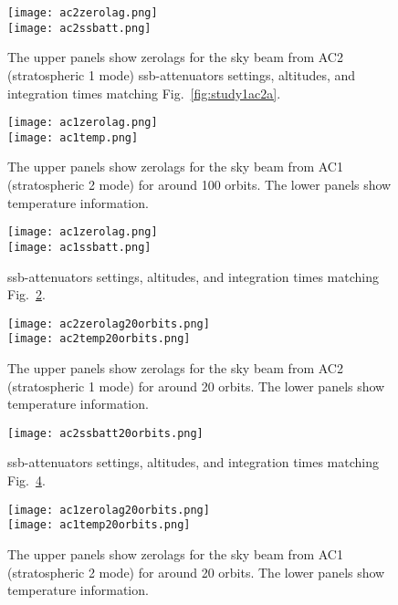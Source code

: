\begin{figure}[!t]
\centering
\texttt{[image: ac2zerolag.png]}\\
\texttt{[image: ac2ssbatt.png]}\\
\caption{The upper panels show zerolags for the sky beam from AC2 
(stratospheric 1 mode)
ssb-attenuators settings, altitudes, and integration times
matching Fig.~\ref{fig:study1ac2a}.}
\label{fig:ac2b}
\end{figure}

\begin{figure}[!t]
\centering
\texttt{[image: ac1zerolag.png]}\\
\texttt{[image: ac1temp.png]}
\caption{The upper panels show zerolags for the sky beam from AC1 
(stratospheric 2 mode)
for around 100 orbits. The lower panels show temperature information.}
\label{fig:study1ac1a}
\end{figure}

\begin{figure}[!t]
\centering
\texttt{[image: ac1zerolag.png]}\\
\texttt{[image: ac1ssbatt.png]}\\
\caption{ssb-attenuators settings, altitudes, and integration times
matching Fig.~\ref{fig:study1ac1a}.}
\label{fig:study1ac1b}
\end{figure}

\begin{figure}[!t]
\centering
\texttt{[image: ac2zerolag20orbits.png]}\\
\texttt{[image: ac2temp20orbits.png]}\\
\caption{The upper panels show zerolags for the sky beam from AC2 
(stratospheric 1 mode)
for around 20 orbits. The lower panels show temperature information.}
\label{fig:study1ac2c}
\end{figure}

\begin{figure}[!t]
\centering
\texttt{[image: ac2ssbatt20orbits.png]}
\caption{ssb-attenuators settings, altitudes, and integration times
matching Fig.~\ref{fig:study1ac2c}.}
\label{fig:study1ac2d}
\end{figure}

\begin{figure}[!t]
\centering
\texttt{[image: ac1zerolag20orbits.png]}\\
\texttt{[image: ac1temp20orbits.png]}
\caption{The upper panels show zerolags for the sky beam from AC1 
(stratospheric 2 mode)
for around 20 orbits. The lower panels show temperature information.}
\label{fig:study1ac1c}
\end{figure}

